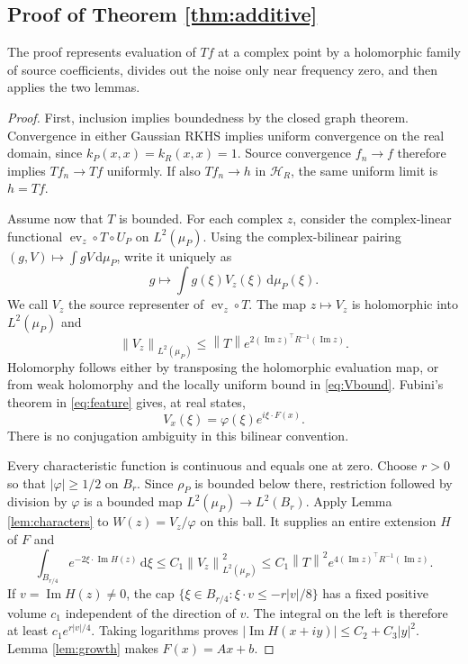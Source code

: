 \documentclass[11pt,a4paper]{article}
\theoremstyle{remark}
\newcommand{\HH}{\mathcal H}
\newcommand{\dd}{\,\mathrm d}
\newcommand{\norm}[1]{\left\lVert#1\right\rVert}
\newcommand{\im}{\operatorname{Im}}
\begin{document}
\subsection{Proof of Theorem \ref{thm:additive}}

The proof represents evaluation of $Tf$ at a complex point by a
holomorphic family of source coefficients, divides out the noise only
near frequency zero, and then applies the two lemmas.

\begin{proof}
First, inclusion implies boundedness by the closed graph theorem.
Convergence in either Gaussian RKHS implies uniform convergence on
the real domain, since $k_P(x,x)=k_R(x,x)=1$. Source convergence
$f_n\to f$ therefore implies $Tf_n\to Tf$ uniformly. If also
$Tf_n\to h$ in $\HH_R$, the same uniform limit is $h=Tf$.

Assume now that $T$ is bounded. For each complex $z$, consider the
complex-linear functional
$\operatorname{ev}_z\circ T\circ U_P$ on $L^2(\mu_P)$.
Using the complex-bilinear pairing $(g,V)\mapsto\int gV\dd\mu_P$,
write it uniquely as
\[
 g\longmapsto\int g(\xi)V_z(\xi)\dd\mu_P(\xi).
\]
We call $V_z$ the source representer of $\operatorname{ev}_z\circ T$.
The map $z\mapsto V_z$ is holomorphic into $L^2(\mu_P)$ and
\begin{equation}\label{eq:Vbound}
 \norm{V_z}_{L^2(\mu_P)}
 \le \norm{T}e^{2(\im z)^\top R^{-1}(\im z)}.
\end{equation}
Holomorphy follows either by transposing the holomorphic evaluation
map, or from weak holomorphy and the locally uniform bound in
\eqref{eq:Vbound}. Fubini's theorem in \eqref{eq:feature} gives,
at real states,
\[
 V_x(\xi)=\varphi(\xi)e^{i\xi\cdot F(x)}.
\]
There is no conjugation ambiguity in this bilinear convention.

Every characteristic function is continuous and equals one at zero.
Choose $r>0$ so that $|\varphi|\ge1/2$ on $B_r$. Since $\rho_P$ is
bounded below there, restriction followed by division by $\varphi$
is a bounded map $L^2(\mu_P)\to L^2(B_r)$.
Apply Lemma \ref{lem:characters} to $W(z)=V_z/\varphi$ on this ball.
It supplies an entire extension $H$ of $F$ and
\begin{equation}\label{eq:capupper}
 \int_{B_{r/4}}e^{-2\xi\cdot\im H(z)}\dd\xi
 \le C_1\norm{V_z}^2_{L^2(\mu_P)}
 \le C_1\norm T^2e^{4(\im z)^\top R^{-1}(\im z)}.
\end{equation}
If $v=\im H(z)\ne0$, the cap
$\{\xi\in B_{r/4}:\xi\cdot v\le-r|v|/8\}$ has a fixed positive
volume $c_1$ independent of the direction of $v$. The integral on the
left is therefore at least $c_1e^{r|v|/4}$.
Taking logarithms proves
$|\im H(x+iy)|\le C_2+C_3|y|^2$.
Lemma \ref{lem:growth} makes $F(x)=Ax+b$.


\end{proof}
\end{document}
